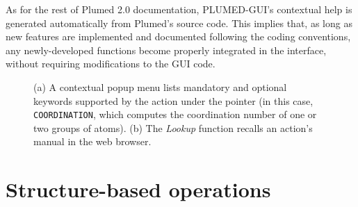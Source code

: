\documentclass[preprint,review,11pt]{elsarticle}
\begin{document}
As for the rest of Plumed 2.0 documentation, PLUMED-GUI's contextual
help is generated automatically from Plumed's source code.  This
implies that, as long as new features are implemented and documented
following the coding conventions, any newly-developed functions become
properly integrated in the interface, without requiring modifications
to the GUI code.






\begin{figure}
  \centering
  \caption{(a) A contextual popup menu lists mandatory and
    optional keywords supported by the action under the pointer (in
    this case, \texttt{COORDINATION}, which computes the coordination
    number of one or two groups of atoms). (b) The \emph{Lookup} function
    recalls an action's manual in the web browser. }
  \label{fig:help}
\end{figure}





\section{Structure-based operations}
\end{document}
